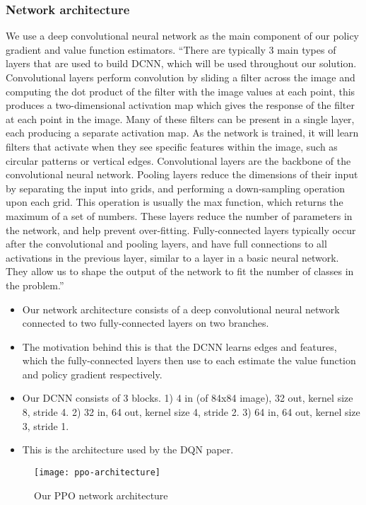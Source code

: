 \documentclass[12pt,a4paper]{article}
\begin{document}
\subsubsection{Network architecture}
We use a deep convolutional neural network as the main component of our policy gradient and value function estimators. ``There are typically 3 main types of layers that are used to build DCNN, which will be
used throughout our solution. Convolutional layers perform convolution by sliding a filter
across the image and computing the dot product of the filter with the image values at each
point, this produces a two-dimensional activation map which gives the response of the filter
at each point in the image. Many of these filters can be present in a single layer, each
producing a separate activation map. As the network is trained, it will learn filters that
activate when they see specific features within the image, such as circular patterns or vertical
edges. Convolutional layers are the backbone of the convolutional neural network. Pooling
layers reduce the dimensions of their input by separating the input into grids, and performing
a down-sampling operation upon each grid. This operation is usually the max function, which
returns the maximum of a set of numbers. These layers reduce the number of parameters in
the network, and help prevent over-fitting. Fully-connected layers typically occur after the
convolutional and pooling layers, and have full connections to all activations in the previous
layer, similar to a layer in a basic neural network. They allow us to shape the output of the
network to fit the number of classes in the problem.''

\begin{itemize}
    \item Our network architecture consists of a deep convolutional neural network connected to two fully-connected layers on two branches. 
    \item The motivation behind this is that the DCNN learns edges and features, which the fully-connected layers then use to each estimate the value function and policy gradient respectively.
    \item Our DCNN consists of 3 blocks. 1) 4 in (of 84x84 image), 32 out, kernel size 8, stride 4. 2) 32 in, 64 out, kernel size 4, stride 2. 3) 64 in, 64 out, kernel size 3, stride 1.
    \item This is the architecture used by the DQN paper.
\end{itemize}

\begin{figure}[h]
\centering
\texttt{[image: ppo-architecture]}
\caption{Our PPO network architecture}
\end{figure}
    
\end{document}
